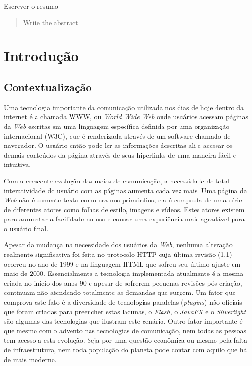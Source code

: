 \documentclass[espaco=simples,appendix=Name]{abnt}
\begin{document}
\capa
\folhaderosto
\sumario
\listoffigures
\listoftables

\newcommand{\ingles}[1]{\textsl{#1}}
\newcommand{\bibTeX}{bib\kern-.13ex\TeX}

\begin{resumo}
  Escrever o resumo
\end{resumo}

\begin{abstract}
  Write the abstract
\end{abstract}

\onehalfspacing

\chapter{Introdução}

\section{Contextualização}

Uma tecnologia importante da comunicação utilizada nos dias de hoje dentro da internet é a chamada WWW, ou \ingles{World Wide Web} onde usuários acessam páginas da \ingles{Web} escritas em uma linguagem específica definida por uma organização internacional (W3C), que é renderizada através de um software chamado de navegador. O usuário então pode ler as informações descritas ali e acessar os demais conteúdos da página através de seus hiperlinks de uma maneira fácil e intuitiva.

Com a crescente evolução dos meios de comunicação, a necessidade de total interatividade do usuário com as páginas aumenta cada vez mais. Uma página da \ingles{Web} não é somente texto como era nos primórdios, ela é composta de uma série de diferentes atores como folhas de estilo, imagens e vídeos. Estes atores existem para aumentar a facilidade no uso e causar uma experiência mais agradável para o usuário final.

Apesar da mudança na necessidade dos usuários da \ingles{Web}, nenhuma alteração realmente significativa foi feita no protocolo HTTP cuja última revisão (1.1) ocorreu no ano de 1999 e na linguagem HTML que sofreu seu último ajuste em maio de 2000. Essencialmente a tecnologia implementada atualmente é a mesma criada no início dos anos 90 e apesar de sofrerem pequenas revisões pós criação, continuam não atendendo totalmente as demandas que surgem. Um fator que comprova este fato é a diversidade de tecnologias paralelas (\ingles{plugins}) não oficiais que foram criadas para preencher estas lacunas, o \ingles{Flash}, o \ingles{JavaFX} e o \ingles{Silverlight} são algumas das tecnologias que ilustram este cenário. Outro fator importante é que mesmo com o advento nas tecnologias de comunicação, nem todas as pessoas tem acesso a esta evolução. Seja por uma questão econômica ou mesmo pela falta de infraestrutura, nem toda população do planeta pode contar com aquilo que há de mais moderno.
\end{document}
